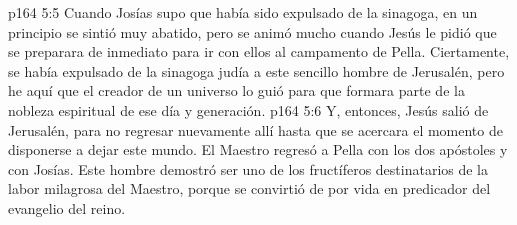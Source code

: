 \vs p164 5:5 Cuando Josías supo que había sido expulsado de la sinagoga, en un principio se sintió muy abatido, pero se animó mucho cuando Jesús le pidió que se preparara de inmediato para ir con ellos al campamento de Pella. Ciertamente, se había expulsado de la sinagoga judía a este sencillo hombre de Jerusalén, pero he aquí que el creador de un universo lo guió para que formara parte de la nobleza espiritual de ese día y generación.
\vs p164 5:6 Y, entonces, Jesús salió de Jerusalén, para no regresar nuevamente allí hasta que se acercara el momento de disponerse a dejar este mundo. El Maestro regresó a Pella con los dos apóstoles y con Josías. Este hombre demostró ser uno de los fructíferos destinatarios de la labor milagrosa del Maestro, porque se convirtió de por vida en predicador del evangelio del reino.
